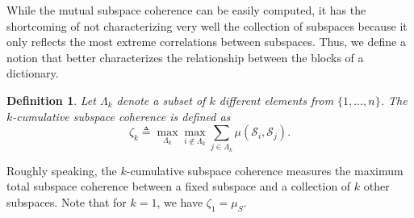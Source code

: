 \documentclass[10pt,twocolumn,twoside] {IEEEtran}
\newtheorem{definition}{Definition}
\begin{document}
While the mutual subspace coherence can be easily computed, it has the shortcoming of not characterizing very well the collection of subspaces because it only reflects the most extreme correlations between subspaces. Thus, we define a notion that better characterizes the relationship between the blocks of a dictionary.
\vspace{1mm}
\begin{definition}
\label{def:cumsubang}
Let $\Lambda_k$ denote a subset of $k$ different elements from $\{1,\ldots, n\}$. The \emph{$k$-cumulative subspace coherence} is defined as
\begin{equation}
\label{eq:cumsubang}
\zeta_k \triangleq \max_{\Lambda_k} \max_{i \notin \Lambda_k} {\sum_{j \in \Lambda_k} \mu(\mathcal{S}_i,\mathcal{S}_j )}.
\end{equation}
\end{definition}
\vspace{1mm}
Roughly speaking, the $k$-cumulative subspace coherence measures the maximum total subspace coherence between a fixed subspace and a collection of $k$ other subspaces. Note that for $k=1$, we have $\zeta_1 = \mu_S$.
\end{document}
